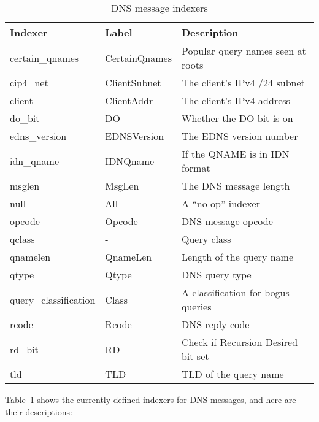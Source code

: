 \documentclass{report}
\begin{document}
\begin{table}
\begin{center}
\begin{tabular}{|lll|}
\hline
Indexer & Label & Description \\
\hline 
certain\_qnames & CertainQnames & Popular query names seen at roots \\
cip4\_net & ClientSubnet & The client's IPv4 /24 subnet \\
client & ClientAddr & The client's IPv4 address \\
do\_bit & DO & Whether the DO bit is on \\
edns\_version & EDNSVersion & The EDNS version number \\
idn\_qname & IDNQname & If the QNAME is in IDN format \\
msglen & MsgLen & The DNS message length \\
null & All & A ``no-op'' indexer \\
opcode & Opcode & DNS message opcode \\
qclass & - & Query class \\
qnamelen & QnameLen & Length of the query name \\
qtype & Qtype & DNS query type \\
query\_classification & Class & A classification for bogus queries \\
rcode & Rcode & DNS reply code \\
rd\_bit & RD & Check if Recursion Desired bit set \\
tld & TLD & TLD of the query name \\
\hline
\end{tabular}
\caption{\label{tbl-dns-indexers}DNS message indexers}
\end{center}
\end{table}

Table~\ref{tbl-dns-indexers} shows the currently-defined indexers
for DNS messages, and here are their descriptions:
\end{document}
